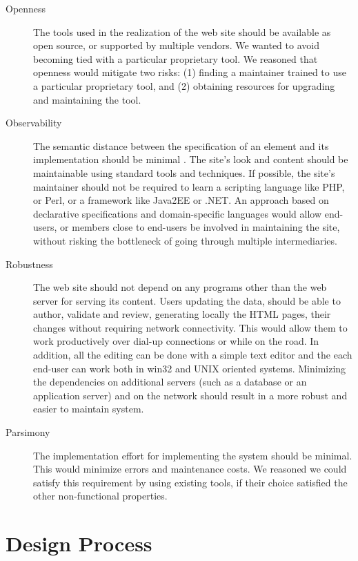 \documentclass[10pt]{article}
\begin{document}
\begin{description}
\item[Openness] The tools used in the realization of the web site
should be available as open source, or supported by multiple vendors.
We wanted to avoid becoming tied with a particular proprietary
tool.
We reasoned that openness would mitigate two risks:
(1) finding a maintainer trained to use a particular proprietary tool,
and (2) obtaining resources for upgrading and maintaining the tool.

\item[Observability]
The semantic distance between
the specification of an element and its implementation 
should be minimal \cite{SG97}.
The site's look and content should be maintainable
using standard tools and techniques.
If possible, the site's maintainer should not be required to
learn a scripting language like PHP, or Perl, or
a framework like Java2EE or .NET.
An approach based on declarative specifications \cite{FFLS00} and
domain-specific languages \cite{DKV00} would allow end-users, or members
close to end-users be involved in maintaining the site,
without risking the bottleneck of going through
multiple intermediaries.

\item[Robustness] The web site should not depend on
any programs other than the web server for serving
its content.
Users updating the data, should be able to author, validate and 
review, generating locally the HTML pages, 
their changes without requiring network connectivity.
This would allow them to work productively over dial-up connections
or while on the road. In addition, all the editing can be done with 
a simple text editor and the each end-user can work both in win32 
and UNIX oriented systems.
Minimizing the dependencies on additional servers (such as a
database or an application server) and on the network
should result in a more robust and easier to maintain system.   

\item[Parsimony] The implementation effort for
implementing the system should be minimal.
This would minimize errors and maintenance costs.
We reasoned we could satisfy this requirement by
using existing tools, if their choice satisfied the
other non-functional properties.
\end{description} 

\section{Design Process}
\end{document}
